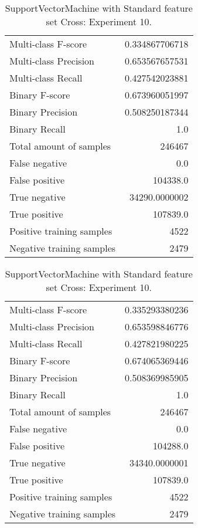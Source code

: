 \begin{table}[H]
\begin{minipage}{0.5\textwidth}
\caption{SupportVectorMachine with Standard feature set Cross: Experiment 9.}
\centering
\begin{tabular}{l r}
\toprule
Multi-class F-score & 0.334867706718 \\
Multi-class Precision & 0.653567657531 \\
Multi-class Recall & 0.427542023881 \\
\midrule
Binary F-score & 0.673960051997 \\
Binary Precision & 0.508250187344 \\
Binary Recall & 1.0 \\
\midrule
Total amount of samples & 246467 \\
False negative & 0.0 \\
False positive & 104338.0 \\
True negative & 34290.0000002 \\
True positive & 107839.0 \\
\midrule
Positive training samples & 4522 \\
Negative training samples & 2479 \\
\bottomrule
\end{tabular}
\end{minipage}
\hfillx
\begin{minipage}{0.5\textwidth}
\caption{SupportVectorMachine with Standard feature set Cross: Experiment 10.}
\centering
\begin{tabular}{l r}
\toprule
Multi-class F-score & 0.335293380236 \\
Multi-class Precision & 0.653598846776 \\
Multi-class Recall & 0.427821980225 \\
\midrule
Binary F-score & 0.674065369446 \\
Binary Precision & 0.508369985905 \\
Binary Recall & 1.0 \\
\midrule
Total amount of samples & 246467 \\
False negative & 0.0 \\
False positive & 104288.0 \\
True negative & 34340.0000001 \\
True positive & 107839.0 \\
\midrule
Positive training samples & 4522 \\
Negative training samples & 2479 \\
\bottomrule
\end{tabular}
\end{minipage}
\end{table}
